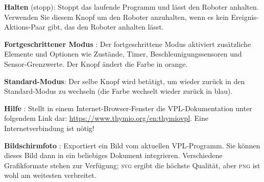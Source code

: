 \bigskip

\textbf{Halten} (stopp): Stoppt das laufende Programm und lässt den Roboter anhalten. Verwenden Sie diesem Knopf um den Roboter anzuhalten, wenn es kein Ereignis-Aktions-Paar gibt, das den Roboter anhalten lässt. 

\bigskip

\textbf{Fortgeschrittener Modus} : Der fortgeschrittene Modus aktiviert zusätzliche Elemente und Optionen wie Zustände, Timer, Beschleunigungssensoren und Sensor-Grenzwerte. Der Knopf ändert die Farbe in orange.

\textbf{Standard-Modus}: Der selbe Knopf  wird betätigt, um wieder zurück in den Standard-Modus zu wechseln (die Farbe wechselt wieder zurück in blau). 

\textbf{Hilfe} : Stellt in einem Internet-Browser-Fenster die VPL-Dokumentation unter folgendem Link dar: \href{https://www.thymio.org/en:thymiovpl}{https://www.thymio.org/en:thymiovpl}. Eine Internetverbindung ist nötig!

\bigskip

\textbf{Bildschirmfoto} : \label{p.export} Exportiert ein Bild vom aktuellen VPL-Programm. Sie können dieses Bild dann in ein beliebiges Dokument integrieren. Verschiedene Grafikformate stehen zur Verfügung; \textsc{svg} ergibt die höchste Qualität, aber \textsc{png} ist wohl am weitesten verbreitet.



